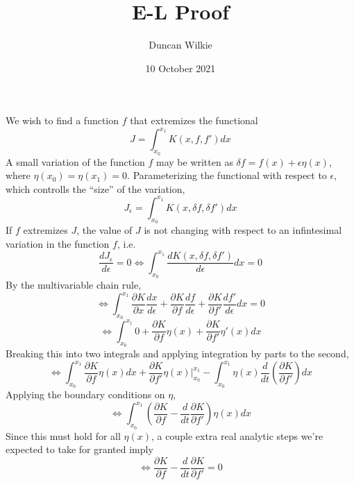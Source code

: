 \documentclass{article}
\title{E-L Proof}
\author{Duncan Wilkie}
\date{10 October 2021}
\begin{document}
\maketitle

\section{}
We wish to find a function $f$ that extremizes the functional
\[J=\int_{x_0}^{x_1}K(x, f, f')dx\]
A small variation of the function $f$ may be written as $\delta f=f(x)+\epsilon\eta(x)$, where $\eta(x_0)=\eta(x_1)=0$. Parameterizing the functional with respect to $\epsilon$, which controlls the ``size'' of the variation,
\[J_\epsilon=\int_{x_0}^{x_1}K(x,\delta f, \delta f')dx\]
If $f$ extremizes $J$, the value of $J$ is not changing with respect to an infintesimal variation in the function $f$, i.e.
\[\frac{dJ_\epsilon}{d\epsilon}=0\Leftrightarrow \int_{x_0}^{x_1}\frac{dK(x,\delta f, \delta f')}{d\epsilon}dx = 0\]
By the multivariable chain rule,
\[\Leftrightarrow \int_{x_0}^{x_1}\frac{\partial K}{\partial x}\frac{d x}{d \epsilon}+\frac{\partial K}{\partial f}\frac{df}{d\epsilon}+\frac{\partial K}{\partial f'}\frac{df'}{d\epsilon}dx = 0\]
\[\Leftrightarrow\int_{x_0}^{x_1}0+\frac{\partial K}{\partial f}\eta(x)+\frac{\partial K}{\partial f'}\eta'(x)dx\]
Breaking this into two integrals and applying integration by parts to the second,
\[\Leftrightarrow \int_{x_0}^{x_1}\frac{\partial K}{\partial f}\eta(x)dx + \frac{\partial K}{\partial f'}\eta(x)\bigg|_{x_0}^{x_1}-\int_{x_0}^{x_1}\eta(x)\frac{d}{dt}\left( \frac{\partial K}{\partial f'} \right)dx\]
Applying the boundary conditions on $\eta$,
\[\Leftrightarrow \int_{x_0}^{x_1}\left( \frac{\partial K}{\partial f}-\frac{d}{dt}\frac{\partial K}{\partial f'} \right)\eta(x)dx\]
Since this must hold for all $\eta(x)$, a couple extra real analytic steps we're expected to take for granted imply
\[\Leftrightarrow \frac{\partial K}{\partial f}-\frac{d}{dt}\frac{\partial K}{\partial f'}=0\]
\end{document}

